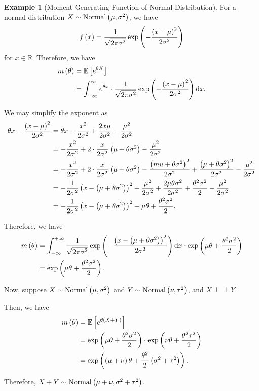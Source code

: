 \documentclass{article}
\theoremstyle{definition}
\newtheorem{example}[theorem]{Example}
\theoremstyle{remark}
\newcommand{\RR}{\mathbb{R}}
\newcommand{\Expt}{\mathbb{E}}
\newcommand{\plusinfty}{+\infty}
\newcommand{\minusinfty}{-\infty}
\newcommand{\indp}{\mathrel{\perp\!\!\!\perp}}
\newcommand{\Normal}{\operatorname{Normal}}
\begin{document}
\begin{example}[Moment Generating Function of Normal Distribution]
    \label{ex:mgf-normal}%
    For a normal distribution \(X \sim \Normal\pqty{\mu, \sigma^2}\), we have
    \[
        f\left(x\right) = \frac{1}{\sqrt{2 \pi \sigma^2}} \exp\left(- \frac{\left(x - \mu\right)^2}{2 \sigma^2}\right)
    \]
    for \(x \in \RR\). Therefore, we have
    \begin{align*}
        m\pqty{\theta} &= \Expt\bqty{e^{\theta X}} \\
        &= \int_{\minusinfty}^{\infty} e^{\theta x} \cdot \frac{1}{\sqrt{2 \pi \sigma^2}} \exp\pqty{- \frac{\pqty{x - \mu}^2}{2 \sigma^2}} \dd{x}.
    \end{align*}

    We may simplify the exponent as
    \begin{align*}
        \theta x - \frac{\left(x - \mu\right)^2}{2 \sigma^2} &= \theta x - \frac{x^2}{2 \sigma^2} + \frac{2 x \mu}{2 \sigma^2} - \frac{\mu^2}{2 \sigma^2} \\
        &= - \frac{x^2}{2 \sigma^2} + 2 \cdot \frac{x}{2 \sigma^2} \left(\mu + \theta \sigma^2\right) - \frac{\mu^2}{2 \sigma^2} \\
        &= - \frac{x^2}{2 \sigma^2} + 2 \cdot \frac{x}{2 \sigma^2} \left(\mu + \theta \sigma^2\right) - \frac{\left(mu + \theta \sigma^2\right)^2}{2 \sigma^2} + \frac{\left(\mu + \theta \sigma^2\right)^2}{2 \sigma^2} - \frac{\mu^2}{2 \sigma^2} \\
        &= - \frac{1}{2 \sigma^2} \left(x - \left(\mu + \theta \sigma^2\right)\right)^2 + \frac{\mu^2}{2 \sigma^2} + \frac{2 \mu \theta \sigma^2}{2 \sigma^2} + \frac{\theta^2 \sigma^2}{2} - \frac{\mu^2}{2 \sigma^2} \\
        &= - \frac{1}{2 \sigma^2} \left(x - \left(\mu + \theta \sigma^2\right)\right)^2 + \mu \theta + \frac{\theta^2 \sigma^2}{2}.
    \end{align*}

    Therefore, we have
    \begin{align*}
        m\pqty{\theta} &= \int_{\minusinfty}^{\plusinfty} \frac{1}{\sqrt{2 \pi \sigma^2}} \exp\pqty{- \frac{\pqty{x - \pqty{\mu + \theta \sigma^2}}^2}{2 \sigma^2}} \dd{x}  \cdot \exp \pqty{\mu \theta + \frac{\theta^2 \sigma^2}{2}} \\
        &= \exp\pqty{\mu \theta + \frac{\theta^2 \sigma^2}{2}}.
    \end{align*}

    Now, suppose \(X \sim \Normal\pqty{\mu, \sigma^2}\) and \(Y \sim \Normal\pqty{\nu, \tau^2}\), and \(X \indp Y\).

    Then, we have
    \begin{align*}
        m\pqty{\theta} &= \Expt\bqty{e^{\theta \pqty{X + Y}}} \\
        &= \exp\pqty{\mu \theta + \frac{\theta^2 \sigma^2}{2}} \cdot \exp\pqty{\nu \theta + \frac{\theta^2 \tau^2}{2}} \\
        &= \exp\pqty{\pqty{\mu + \nu} \theta + \frac{\theta^2}{2} \pqty{\sigma^2 + \tau^2}}.
    \end{align*}

    Therefore, \(X + Y \sim \Normal\pqty{\mu + \nu, \sigma^2 + \tau^2}\).
\end{example}
\end{document}
